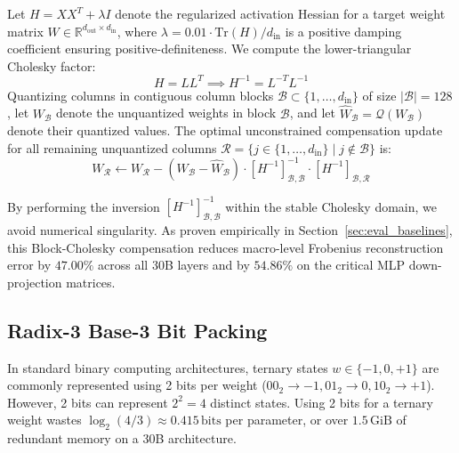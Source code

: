 \documentclass[10pt,twocolumn,letterpaper]{article}
\newcommand{\R}{\mathbb{R}}
\begin{document}
Let $H = X X^T + \lambda I$ denote the regularized activation Hessian for a target weight matrix $W \in \R^{d_{\text{out}} \times d_{\text{in}}}$, where $\lambda = 0.01 \cdot \text{Tr}(H) / d_{\text{in}}$ is a positive damping coefficient ensuring positive-definiteness. We compute the lower-triangular Cholesky factor:
\begin{equation}
    H = L L^T \implies H^{-1} = L^{-T} L^{-1}
\end{equation}
Quantizing columns in contiguous column blocks $\mathcal{B} \subset \{1, \dots, d_{\text{in}}\}$ of size $|\mathcal{B}| = 128$, let $W_{\mathcal{B}}$ denote the unquantized weights in block $\mathcal{B}$, and let $\widehat{W}_{\mathcal{B}} = \mathcal{Q}(W_{\mathcal{B}})$ denote their quantized values. The optimal unconstrained compensation update for all remaining unquantized columns $\mathcal{R} = \{j \in \{1, \dots, d_{\text{in}}\} \mid j \notin \mathcal{B}\}$ is:
\begin{equation}
    W_{\mathcal{R}} \gets W_{\mathcal{R}} - \left( W_{\mathcal{B}} - \widehat{W}_{\mathcal{B}} \right) \cdot \left[ H^{-1} \right]_{\mathcal{B}, \mathcal{B}}^{-1} \cdot \left[ H^{-1} \right]_{\mathcal{B}, \mathcal{R}}
    \label{eq:cholesky_update}
\end{equation}

By performing the inversion $[H^{-1}]_{\mathcal{B}, \mathcal{B}}^{-1}$ within the stable Cholesky domain, we avoid numerical singularity. As proven empirically in Section~\ref{sec:eval_baselines}, this Block-Cholesky compensation reduces macro-level Frobenius reconstruction error by \textbf{$47.00\%$} across all 30B layers and by \textbf{$54.86\%$} on the critical MLP down-projection matrices.

\subsection{Radix-3 Base-3 Bit Packing}
\label{sec:math_radix}
In standard binary computing architectures, ternary states $w \in \{-1, 0, +1\}$ are commonly represented using 2 bits per weight ($00_2 \to -1, 01_2 \to 0, 10_2 \to +1$). However, 2 bits can represent $2^2 = 4$ distinct states. Using 2 bits for a ternary weight wastes $\log_2(4/3) \approx 0.415\,\text{bits}$ per parameter, or over $1.5\,\text{GiB}$ of redundant memory on a 30B architecture.
\end{document}
